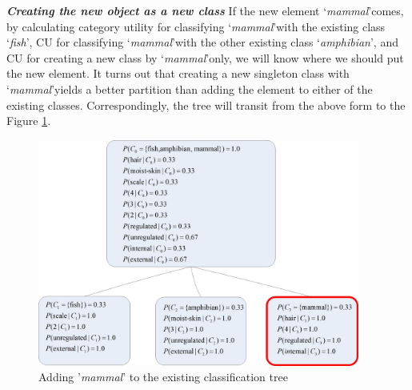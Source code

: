 \textbf{\emph{Creating the new object as a new class}} If the new element \lq{\emph{mammal}}\rq comes, by calculating category utility for classifying \lq{\emph{mammal}}\rq with the existing class \lq{\emph{fish}}\rq, CU for classifying \lq{\emph{mammal}}\rq with the other existing class \lq{\emph{amphibian}}\rq, and CU for creating a new class by \lq{\emph{mammal}}\rq only, we will know where we should put the new element. It turns out that creating a new singleton class with \lq{\emph{mammal}}\rq yields a better partition than adding the element to either of the existing classes. Correspondingly, the tree will transit from the above form to the Figure \ref{Fig:animaltree_create}.
\begin{figure}[!ht]
    \centering
    \includegraphics[width=300pt]{../images/animaltree_create.jpg}
    \caption{Adding '\emph{mammal}' to the existing classification tree}
    \label{Fig:animaltree_create}
\end{figure}


